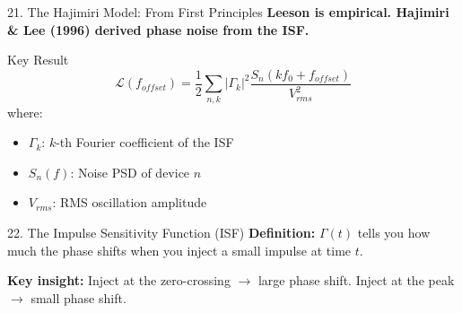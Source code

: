 \documentclass[aspectratio=169, 11pt]{beamer}
\begin{document}
\begin{frame}{21. The Hajimiri Model: From First Principles}
    \textbf{Leeson is empirical. Hajimiri \& Lee (1996) derived phase noise from the ISF.}

    \vspace{0.5em}
    \begin{block}{Key Result}
        \[ \mathcal{L}(f_{offset}) = \frac{1}{2} \sum_{n,k} |\Gamma_k|^2 \frac{S_n(k f_0 + f_{offset})}{V_{rms}^2} \]
        where:
        \begin{itemize}
            \item $\Gamma_k$: $k$-th Fourier coefficient of the ISF
            \item $S_n(f)$: Noise PSD of device $n$
            \item $V_{rms}$: RMS oscillation amplitude
        \end{itemize}
    \end{block}
\end{frame}

\begin{frame}{22. The Impulse Sensitivity Function (ISF)}
    \textbf{Definition:} $\Gamma(t)$ tells you how much the phase shifts when you inject a small impulse at time $t$.

    \vspace{0.5em}
    \begin{center}
    \end{center}

    \vspace{0.3em}
    \textbf{Key insight:} Inject at the zero-crossing $\rightarrow$ large phase shift. Inject at the peak $\rightarrow$ small phase shift.
\end{frame}
\end{document}
